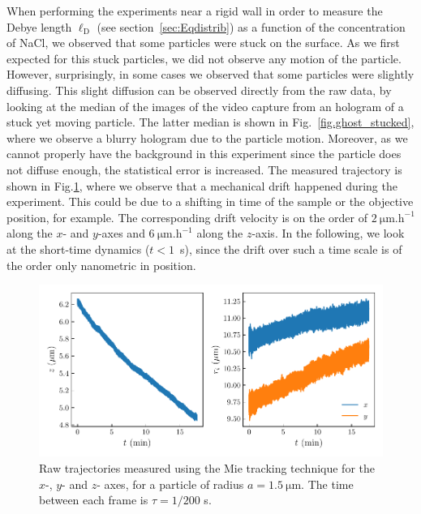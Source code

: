 When performing the experiments near a rigid wall in order to  measure the Debye length $\ell _\mathrm{D}$ (see section~\ref{sec:Eqdistrib}) as a function of the concentration of NaCl, we observed that some particles were stuck on the surface. As we first expected for this stuck particles, we did not observe any motion of the particle. However, surprisingly, in some cases we observed that some particles were slightly diffusing. This slight diffusion can be observed directly from the raw data, by looking at the median of the images of the video capture from an hologram of a stuck yet moving particle. The latter median is shown in Fig.~\ref{fig.ghost_stucked}, where we observe a blurry hologram due to the particle motion. Moreover, as we cannot properly have the background in this experiment since the particle does not diffuse enough, the statistical error is increased. The measured trajectory is shown in Fig.\ref{fig.trajectory_stuck}, where we observe that a mechanical drift happened during the experiment. This could be due to a shifting in time of the sample or the objective position, for example. The corresponding drift velocity is on the order of $2 ~ \mathrm{\mu m.h^{-1}}$ along the $x$- and $y$-axes and  $6 ~ \mathrm{\mu m.h^{-1}}$ along the $z$-axis. In the following, we look at the short-time dynamics ($t < 1$~s), since the drift over such a time scale is of the order only nanometric in position.

\begin{figure}[H]
	\centering
	\includegraphics{02_body/chapter4/images/stucked_particle/trajectory_stucked.pdf}
	\caption{Raw trajectories measured using the Mie tracking technique for the $x$-, $y$- and $z$- axes, for a particle of radius $a=1.5 ~\mathrm{\mu m}$. The time between each frame is $\tau = 1/200$ s. ~\href{https://github.com/eXpensia/Confined-Brownian-Motion/blob/main/02_body/chapter4/images/stucked_particle/Full\%20analysis\%20trajectory_using_Dyacine_adding_x_y_distrib.ipynb}{\faGithub}}
	\label{fig.trajectory_stuck}
\end{figure}



